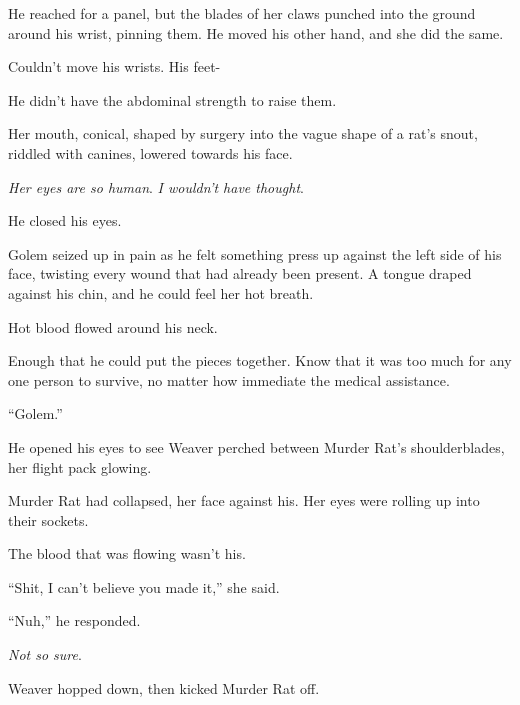 He reached for a panel, but the blades of her claws punched into the ground around his wrist, pinning them.  He moved his other hand, and she did the same.



Couldn't move his wrists.  His feet-



He didn't have the abdominal strength to raise them.



Her mouth, conical, shaped by surgery into the vague shape of a rat's snout, riddled with canines, lowered towards his face.



\emph{Her eyes are so human}.  \emph{I wouldn't have thought}.



He closed his eyes.



Golem seized up in pain as he felt something press up against the left side of his face, twisting every wound that had already been present.  A tongue draped against his chin, and he could feel her hot breath.



Hot blood flowed around his neck.



Enough that he could put the pieces together.  Know that it was too much for any one person to survive, no matter how immediate the medical assistance.



``Golem.''



He opened his eyes to see Weaver perched between Murder Rat's shoulderblades, her flight pack glowing.



Murder Rat had collapsed, her face against his.  Her eyes were rolling up into their sockets.



The blood that was flowing wasn't his.



``Shit, I can't believe you made it,'' she said.



``Nuh,'' he responded.



\emph{Not so sure}.



Weaver hopped down, then kicked Murder Rat off.



